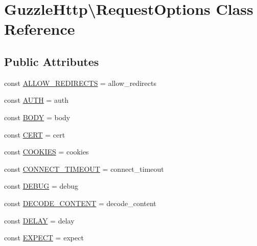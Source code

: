 \hypertarget{classGuzzleHttp_1_1RequestOptions}{}\section{Guzzle\+Http\textbackslash{}Request\+Options Class Reference}
\label{classGuzzleHttp_1_1RequestOptions}
\subsection*{Public Attributes}
\begin{DoxyCompactItemize}
\item 
const \hyperlink{classGuzzleHttp_1_1RequestOptions_a4adbc55b965409eb5d798d4898e6865f}{A\+L\+L\+O\+W\+\_\+\+R\+E\+D\+I\+R\+E\+C\+TS} = \textquotesingle{}allow\+\_\+redirects\textquotesingle{}
\item 
const \hyperlink{classGuzzleHttp_1_1RequestOptions_a4eb12a240ccc24b944c8c605b46abe57}{A\+U\+TH} = \textquotesingle{}auth\textquotesingle{}
\item 
const \hyperlink{classGuzzleHttp_1_1RequestOptions_ab4288a653aa6c7e705a526467ff604c6}{B\+O\+DY} = \textquotesingle{}body\textquotesingle{}
\item 
const \hyperlink{classGuzzleHttp_1_1RequestOptions_a9e1d557973fcd84a1167d42160e597ff}{C\+E\+RT} = \textquotesingle{}cert\textquotesingle{}
\item 
const \hyperlink{classGuzzleHttp_1_1RequestOptions_a000c2e4aacadb24f50bdbe8b9de7d66b}{C\+O\+O\+K\+I\+ES} = \textquotesingle{}cookies\textquotesingle{}
\item 
const \hyperlink{classGuzzleHttp_1_1RequestOptions_a71d2b2161d9effbee1127fc30556d642}{C\+O\+N\+N\+E\+C\+T\+\_\+\+T\+I\+M\+E\+O\+UT} = \textquotesingle{}connect\+\_\+timeout\textquotesingle{}
\item 
const \hyperlink{classGuzzleHttp_1_1RequestOptions_a0daced002d8b905dceeba32b01e30254}{D\+E\+B\+UG} = \textquotesingle{}debug\textquotesingle{}
\item 
const \hyperlink{classGuzzleHttp_1_1RequestOptions_a0752814d623e7a096ece15b1131f0d53}{D\+E\+C\+O\+D\+E\+\_\+\+C\+O\+N\+T\+E\+NT} = \textquotesingle{}decode\+\_\+content\textquotesingle{}
\item 
const \hyperlink{classGuzzleHttp_1_1RequestOptions_a95382af047ce6e2408c717907de99447}{D\+E\+L\+AY} = \textquotesingle{}delay\textquotesingle{}
\item 
const \hyperlink{classGuzzleHttp_1_1RequestOptions_a2263e005c55a56a31bdefd92c7a28a63}{E\+X\+P\+E\+CT} = \textquotesingle{}expect\textquotesingle{}

\end{DoxyCompactItemize}
